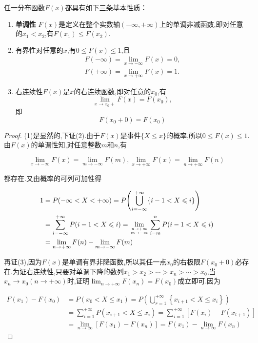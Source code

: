 \begin{theorem}{}{}
	任一分布函数$F(x)$都具有如下三条基本性质：
	\begin{enumerate}
		\item \textbf{单调性} $ F(x) $是定义在整个实数轴$ (-\infty,+\infty ) $上的单调非减函数,即对任意的$ x_1<x_2 $,有$ F(x_1)\leq F(x_2) $.
		\item 有界性对任意的$ x $,有$ 0\leq F(x)\leq 1 $,且
		\[
		\begin{array}{l}{F(-\infty)=\lim _{x \rightarrow-\infty} F(x)=0}, \\ {F(+\infty)=\lim _{x \rightarrow+\infty} F(x)=1}.\end{array}
		\]
		
		\item 右连续性$ F(x) $是$ x $的右连续函数,即对任意的$ x_0 $,有
		\[
		\lim _{x \rightarrow x_{0}+} F(x)=F\left(x_{0}\right),
		\]
		即
		\[
		F\left(x_{0}+0\right)=F\left(x_{0}\right)
		\]
	\end{enumerate}
\end{theorem}

\begin{proof}
	(1)是显然的,下证(2).由于$ F(x) $是事件$\{X \leqslant x\}$的概率,所以$ 0\leq
	F(x)\leq 1 $.由$ F(x) $的单调性知,对任意整数$ m $和$ n $,有
	
	\[
	\lim _{x \rightarrow-\infty} F(x)=\lim _{m \rightarrow-\infty} F(m), \lim _{x \rightarrow+\infty} F(x)=\lim _{n \rightarrow+\infty} F(n)
	\]
	
	都存在.又由概率的可列可加性得
	
	
  \begin{align*}
    1 & = P(-\infty<X<+\infty) = P\left(\bigcup_{i=-\infty}^{+\infty}\{i-1<X \leqslant i\}\right) \\ & = \sum_{i=-\infty}^{+\infty} P(i-1<X \leqslant i)=\lim _{n \rightarrow+\infty \atop m \rightarrow-\infty} \sum_{i =m}^{n} P(i-1<X \leqslant i) \\
    &=\lim _{n \rightarrow+\infty} F(n)-\lim _{m \rightarrow-\infty} F(m)
  \end{align*}

	
	再证(3),因为$ F(x) $是单调有界非降函数,所以其任一点$ x_0 $的右极限$ F(x_0+0) $必存在.为证右连续性,只要对单调下降的数列$x_{1}>x_{2}>\cdots>x_{n}>\cdots>x_{0}$,当$x_{n} \rightarrow x_{0}(n \rightarrow+\infty)$时,证明$\lim _{n \rightarrow+\infty} F\left(x_{n}\right)=F\left(x_{0}\right)$成立即可.因为
	
	\begin{align*}
	F\left(x_{1}\right)-F\left(x_{0}\right) & =P\left(x_{0}<X \leqslant x_{1}\right)=P\left(\bigcup_{r=1}^{+\infty}\left\{x_{i+1}<X \leqslant x_{i}\right\}\right) \\
	&=\sum_{i=1}^{+\infty} P\left(x_{i+1}<X \leqslant x_{i}\right)=\sum_{i=1}^{+\infty}\left[F\left(x_{i}\right)-F\left(x_{t+1}\right)\right] \\
	&=\lim _{n \rightarrow \infty}\left[F\left(x_{1}\right)-F\left(x_{n}\right)\right]=F\left(x_{1}\right)-\lim _{n \rightarrow \infty} F\left(x_{n}\right)
	\end{align*}
\end{proof}

